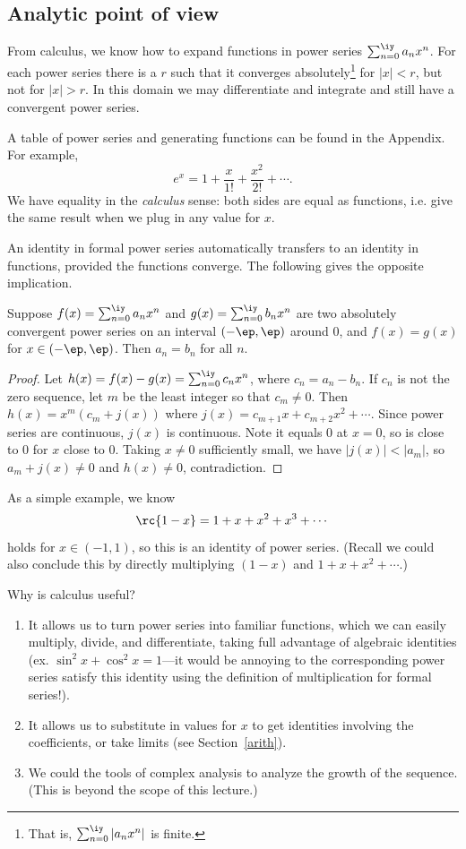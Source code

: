 \subsection{Analytic point of view}\label{calc}
From calculus, we know how to expand functions in power series $\sum_{n=0}^{\iy}a_nx^n$. For each power series there is a $r$ such that it converges absolutely\footnote{That is, $\sum_{n=0}^{\iy} |a_nx^n|$ is finite.} for $|x|<r$, but not for $|x|>r$. In this domain we may differentiate and integrate and still have a convergent power series. 

A table of power series and generating functions can be found in the Appendix. For example,
\[
e^x=1+\frac{x}{1!}+\frac{x^2}{2!}+\cdots.
\]
We have equality in the {\it calculus} sense: both sides are equal as functions, i.e. give the same result when we plug in any value for $x$.

An identity in formal power series automatically transfers to an identity in functions, provided the functions converge. The following gives the opposite implication.
\begin{thm}\label{calctoform}
Suppose $f(x)=\sum_{n=0}^{\iy} a_nx^n$ and $g(x)=\sum_{n=0}^{\iy} b_nx^n$ are two absolutely convergent power series on an interval $(-\ep,\ep)$ around 0, and $f(x)=g(x)$ for $x\in (-\ep,\ep)$. Then $a_n=b_n$ for all $n$.
\end{thm}
\begin{proof}
Let $h(x)=f(x)-g(x)=\sum_{n=0}^{\iy} c_nx^n$, where $c_n=a_n-b_n$. If $c_n$ is not the zero sequence, let $m$ be the least integer so that $c_m\ne 0$. Then $h(x)=x^m(c_m+j(x))$ where $j(x)=c_{m+1}x+c_{m+2}x^2+\cdots$. Since power series are continuous, $j(x)$ is continuous. Note it equals 0 at $x=0$, so is close to 0 for $x$ close to 0. Taking $x\ne 0$ sufficiently small, we have $|j(x)|<|a_m|$, so $a_m+j(x)\ne 0$ and $h(x)\ne 0$, contradiction.
\end{proof}
As a simple example, we know
\[
\rc{1-x}=1+x+x^2+x^3+\cdots
\]
holds for $x\in (-1,1)$, so this is an identity of power series. (Recall we could also conclude this by directly multiplying $(1-x)$ and $1+x+x^2+\cdots$.)

Why is calculus useful?
\begin{enumerate}
\item It allows us to turn power series into familiar functions, which we can easily multiply, divide, and differentiate, taking full advantage of algebraic identities (ex. $\sin^2x+\cos^2x=1$---it would be annoying to the corresponding power series satisfy this identity using the definition of multiplication for formal series!).
\item It allows us to substitute in values for $x$ to get identities involving the coefficients, or take limits (see Section~\ref{arith}).
\item We could the tools of complex analysis to analyze the growth of the sequence. (This is beyond the scope of this lecture.)
\end{enumerate}
